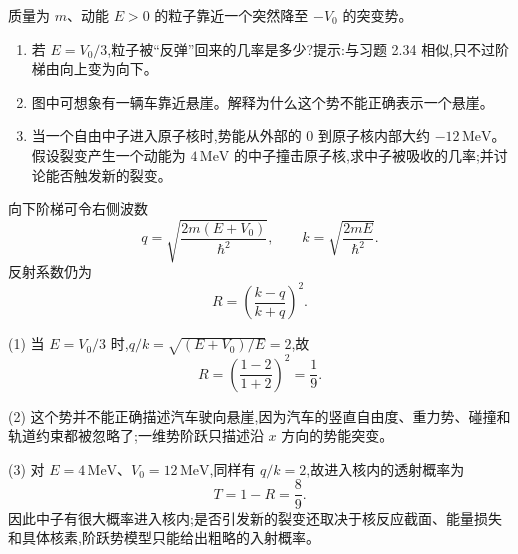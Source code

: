 \begin{question}
质量为 $m$、动能 $E>0$ 的粒子靠近一个突然降至 $-V_0$ 的突变势。
\begin{enumerate}
\item 若 $E=V_0/3$,粒子被“反弹”回来的几率是多少?提示:与习题 2.34 相似,只不过阶梯由向上变为向下。
\item 图中可想象有一辆车靠近悬崖。解释为什么这个势不能正确表示一个悬崖。
\item 当一个自由中子进入原子核时,势能从外部的 $0$ 到原子核内部大约 $-12\,\mathrm{MeV}$。假设裂变产生一个动能为 $4\,\mathrm{MeV}$ 的中子撞击原子核,求中子被吸收的几率;并讨论能否触发新的裂变。
\end{enumerate}
\end{question}
\begin{solution}
向下阶梯可令右侧波数
\[
q=\sqrt{\frac{2m(E+V_0)}{\hbar^2}},
\qquad
k=\sqrt{\frac{2mE}{\hbar^2}}.
\]
反射系数仍为
\[
R=\left(\frac{k-q}{k+q}\right)^2.
\]

(1) 当 $E=V_0/3$ 时,$q/k=\sqrt{(E+V_0)/E}=2$,故
\[
R=\left(\frac{1-2}{1+2}\right)^2=\frac19.
\]

(2) 这个势并不能正确描述汽车驶向悬崖,因为汽车的竖直自由度、重力势、碰撞和轨道约束都被忽略了;一维势阶跃只描述沿 $x$ 方向的势能突变。

(3) 对 $E=4\,\mathrm{MeV}$、$V_0=12\,\mathrm{MeV}$,同样有 $q/k=2$,故进入核内的透射概率为
\[
T=1-R=\frac89.
\]
因此中子有很大概率进入核内;是否引发新的裂变还取决于核反应截面、能量损失和具体核素,阶跃势模型只能给出粗略的入射概率。
\end{solution}

